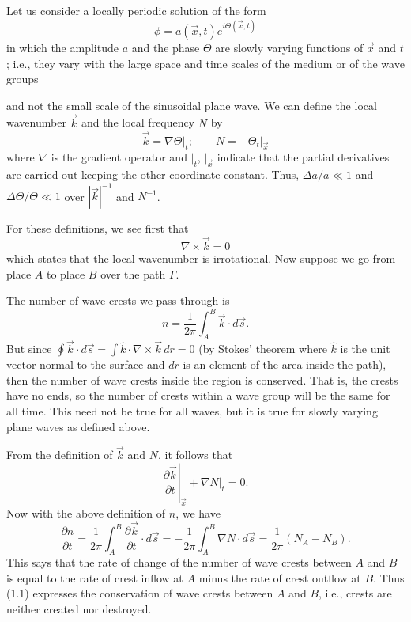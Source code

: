 Let us consider a locally periodic solution of the form
\[
	\phi=a(\vec{x},t)e^{i\Theta(\vec{x},t)}
\]
in which the amplitude $a$ and the phase $\Theta$ are slowly varying functions of
$\vec{x}$ and $t$; i.e., they vary with the large space and time scales of the medium or
of the wave groups

\sourcepagebreak

and not the small scale of the sinusoidal plane wave. We can define the local
wavenumber $\vec{k}$ and the local frequency $N$ by
\[
	\vec{k}=\left.\nabla\Theta\right|_t;
	\qquad
	N=-\left.\Theta_t\right|_{\vec{x}}
\]
where $\nabla$ is the gradient operator and $|_t$, $|_{\vec{x}}$ indicate that the
partial derivatives are carried out keeping the other coordinate constant. Thus,
$\Delta a/a\ll1$ and $\Delta\Theta/\Theta\ll1$ over $|\vec{k}|^{-1}$ and $N^{-1}$.

For these definitions, we see first that
\[
	\nabla\times\vec{k}=0
\]
which states that the local wavenumber is irrotational. Now suppose we go from place
$A$ to place $B$ over the path $\Gamma$.


The number of wave crests we pass through is
\[
	n=\frac{1}{2\pi}\int_A^B\vec{k}\cdot d\vec{s}.
\]
But since
$\oint\vec{k}\cdot d\vec{s}=\int\hat{k}\cdot\nabla\times\vec{k}\,dr=0$
(by Stokes' theorem where $\hat{k}$ is the unit vector normal to the surface and $dr$
is an element of the area inside the path), then the number of wave crests inside the
region is conserved. That is, the crests have no ends, so the number of crests within a
wave group will be the same for all time. This need not be true for all waves, but it is
true for slowly varying plane waves as defined above.

\sourcepagebreak

From the definition of $\vec{k}$ and $N$, it follows that
\begin{equation}
	\left.\frac{\partial\vec{k}}{\partial t}\right|_{\vec{x}}
	+\left.\nabla N\right|_t=0.
	\tag{1.1}
\end{equation}
Now with the above definition of $n$, we have
\[
	\frac{\partial n}{\partial t}
	=\frac{1}{2\pi}\int_A^B\frac{\partial\vec{k}}{\partial t}\cdot d\vec{s}
	=-\frac{1}{2\pi}\int_A^B\nabla N\cdot d\vec{s}
	=\frac{1}{2\pi}(N_A-N_B).
\]
This says that the rate of change of the number of wave crests between $A$ and $B$ is
equal to the rate of crest inflow at $A$ minus the rate of crest outflow at $B$. Thus
(1.1) expresses the conservation of wave crests between $A$ and $B$, i.e., crests are
neither created nor destroyed.

